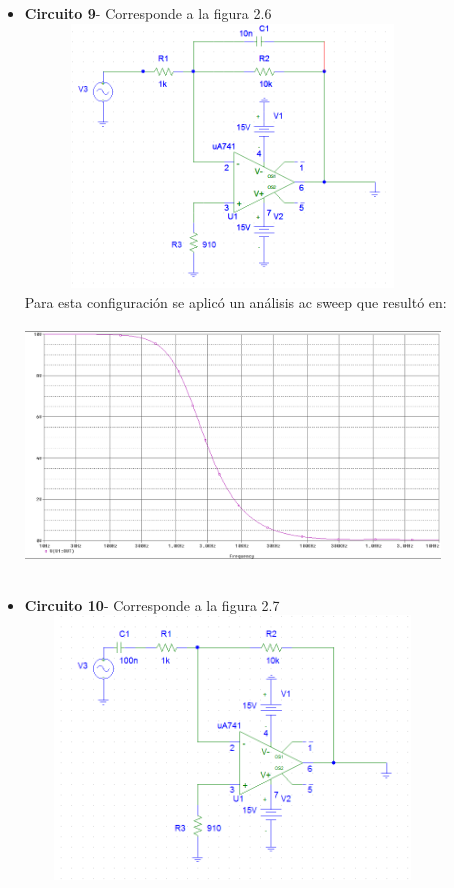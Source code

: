 \documentclass[12pt]{article}
\begin{document}
\begin{itemize}
		\newpage
		
		\item \textbf{Circuito 9}- Corresponde a la figura 2.6\\
		
		\includegraphics[width=11cm,height=7cm]{Img/opam_ua741_pasa_bajo_act}\\
		
		\noindent Para esta configuración se aplicó un análisis ac sweep que resultó en:\\
		
		\includegraphics[width=11cm,height=7cm]{Img/filtro_pasa_bajo_activo}\\
		
		\newpage
		
		\item \textbf{Circuito 10}- Corresponde a la figura 2.7\\
		
		\includegraphics[width=11cm,height=7cm]{Img/opam_ua741_pasa_alto_act}\\
		

\end{itemize}
\end{document}
